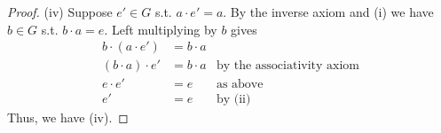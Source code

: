 \documentclass[12pt]{article}
\begin{document}
\begin{proof}
    (iv)
    Suppose $e' \in G$ s.t. $a \cdot e' = a$.
    By the inverse axiom and (i) we have $b \in G$ s.t. $b \cdot a = e$.
    Left multiplying by $b$ gives 
    \begin{align*}
        b \cdot (a \cdot e') &= b \cdot a\\
        (b \cdot a) \cdot e'   &= b \cdot a &\text{by the associativity axiom}\\
        e \cdot e' &= e &\text{as above}\\
        e' &= e &\text{by (ii)}
    \end{align*}
    Thus, we have (iv).
\end{proof}
\end{document}
